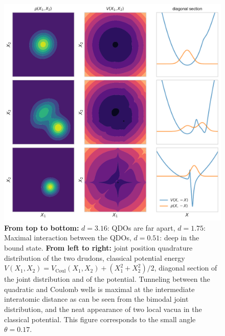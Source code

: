 \documentclass[reprint, amsmath, amssymb, floatfix, aps, pra]{revtex4-2}
\begin{document}
    \begin{figure}
        \includegraphics[scale=0.85]{figures/classical_potential_small_angle.pdf}
        \caption{\label{fig:classical_potential_small_angle}\textbf{From top to bottom:} $d=3.16$: QDOs are far apart, $d=1.75$: Maximal interaction between the QDOs, $d=0.51$: deep in the bound state. \textbf{From left to right:} joint position quadrature distribution of the two drudons, classical potential energy $V(X_1,X_2) = V_\text{Coul}(X_1,X_2) + (X_1^2 + X_2^2) /2$, diagonal section of the joint distribution and of the potential. Tunneling between the quadratic and Coulomb wells is maximal at the intermediate interatomic distance as can be seen from the bimodal joint distribution, and the neat appearance of two local vacua in the classical potential. This figure corresponds to the small angle $\theta=0.17$.}
    \end{figure}
\end{document}
